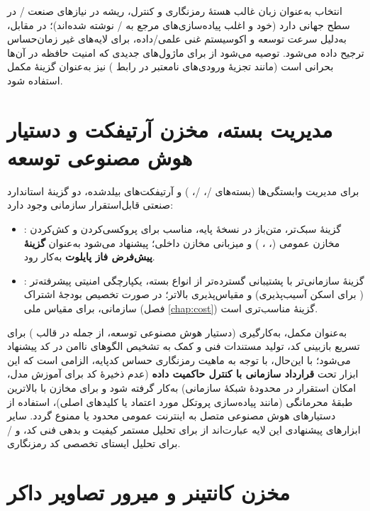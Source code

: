انتخاب  به‌عنوان زبان غالب هستهٔ رمزنگاری و کنترل، ریشه در نیازهای صنعت / در سطح جهانی دارد (خود  و اغلب پیاده‌سازی‌های مرجع  به / نوشته شده‌اند)؛  در مقابل، به‌دلیل سرعت توسعه و اکوسیستم غنی علمی/داده، برای لایه‌های غیر زمان‌حساس ترجیح داده می‌شود. توصیه می‌شود از  برای ماژول‌های جدیدی که امنیت حافظه در آن‌ها بحرانی است (مانند تجزیهٔ ورودی‌های نامعتبر در رابط ) نیز به‌عنوان گزینهٔ مکمل  استفاده شود.

\section{مدیریت بسته، مخزن آرتیفکت و دستیار هوش مصنوعی توسعه}

برای مدیریت وابستگی‌ها (بسته‌های /، /، ) و آرتیفکت‌های بیلدشده، دو گزینهٔ استاندارد صنعتی قابل‌استقرار سازمانی وجود دارد:

\begin{itemize}
\item \textbf{}: گزینهٔ سبک‌تر، متن‌باز در نسخهٔ پایه، مناسب برای پروکسی‌کردن و کش‌کردن مخازن عمومی (، ، ) و میزبانی مخازن داخلی؛ پیشنهاد می‌شود به‌عنوان \textbf{گزینهٔ پیش‌فرض فاز پایلوت} به‌کار رود.
\item \textbf{}: گزینهٔ سازمانی‌تر با پشتیبانی گسترده‌تر از انواع بسته، یکپارچگی امنیتی پیشرفته‌تر ( برای اسکن آسیب‌پذیری) و مقیاس‌پذیری بالاتر؛ در صورت تخصیص بودجهٔ اشتراک سازمانی، برای مقیاس ملی (فصل \ref{chap:cost}) گزینهٔ مناسب‌تری است.
\end{itemize}

به‌عنوان مکمل، به‌کارگیری  (دستیار هوش مصنوعی توسعه، از جمله در قالب ) برای تسریع بازبینی کد، تولید مستندات فنی و کمک به تشخیص الگوهای ناامن در کد پیشنهاد می‌شود؛ با این‌حال، با توجه به ماهیت رمزنگاری حساس کدپایه، الزامی است که این ابزار تحت \textbf{قرارداد سازمانی با کنترل حاکمیت داده} (عدم ذخیرهٔ کد برای آموزش مدل، امکان استقرار در محدودهٔ شبکهٔ سازمانی) به‌کار گرفته شود و برای مخازن با بالاترین طبقهٔ محرمانگی (مانند پیاده‌سازی پروتکل مورد اعتماد یا کلیدهای اصلی)، استفاده از دستیارهای هوش مصنوعی متصل به اینترنت عمومی محدود یا ممنوع گردد. سایر ابزارهای پیشنهادی این لایه عبارت‌اند از  برای تحلیل مستمر کیفیت و بدهی فنی کد، و / برای تحلیل ایستای تخصصی کد  رمزنگاری.

\section{مخزن کانتینر و میرور تصاویر داکر}

